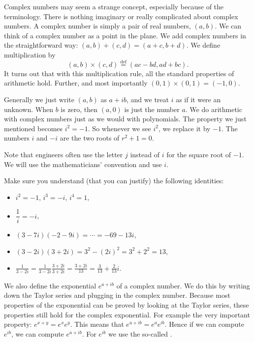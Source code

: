 \documentclass[12pt]{book}
\begin{document}
Complex numbers may seem a strange concept, especially because of the
terminology.  There is nothing imaginary or really complicated about complex
numbers.
A complex number is simply a pair of real numbers, $(a,b)$.  We can
think of a complex number as a point in the plane.  We add complex numbers
in the straightforward way: $(a,b)+(c,d)=(a+c,b+d)$.  We define
multiplication by
\begin{equation*}
(a,b) \times (c,d) \overset{\text{def}}{=} (ac-bd,ad+bc) .
\end{equation*}
It turns out that with this multiplication rule, all the standard properties
of arithmetic hold.  Further, and most importantly $(0,1) \times (0,1) =
(-1,0)$.

Generally we just write $(a,b)$ as $a+ib$, and we treat $i$ as if it were an
unknown.  When $b$ is zero, then $(a,0)$ is just the number $a$.
We do arithmetic with complex numbers just as we would
with polynomials.  The property we just mentioned becomes $i^2 = -1$.
So whenever we see $i^2$, we replace it by $-1$.
The numbers
$i$ and $-i$ are the two roots of $r^2 + 1 = 0$.

Note that engineers often use the letter $j$ instead of $i$ for the square
root of $-1$.  We will use the mathematicians' convention and use $i$.

\begin{exercise}
Make sure you understand (that you can justify)
the following identities:
\begin{itemize}
\item $i^2 = -1$, $i^3 = -i$, $i^4 = 1$,
\item $\dfrac{1}{i} = -i$,
\item $(3-7i)(-2-9i) = \cdots = -69-13i$,
\item $(3-2i)(3+2i) = 3^2 - {(2i)}^2 = 3^2 + 2^2 = 13$,
\item $\frac{1}{3-2i} = \frac{1}{3-2i} \frac{3+2i}{3+2i} = \frac{3+2i}{13}
= \frac{3}{13}+\frac{2}{13}i$.
\end{itemize}
\end{exercise}

We also define the exponential $e^{a+ib}$ of a complex number.  We do
this by writing down the Taylor series and plugging in the complex
number.  Because most properties of the exponential can be proved by looking
at the Taylor series, these
properties still hold for the complex
exponential.  For example the very important property: $e^{x+y} = e^x e^y$.  This means that
$e^{a+ib} = e^a e^{ib}$.  Hence if we can compute $e^{ib}$, we can
compute $e^{a+ib}$.  For $e^{ib}$ we use the so-called
\emph{}.
\end{document}
